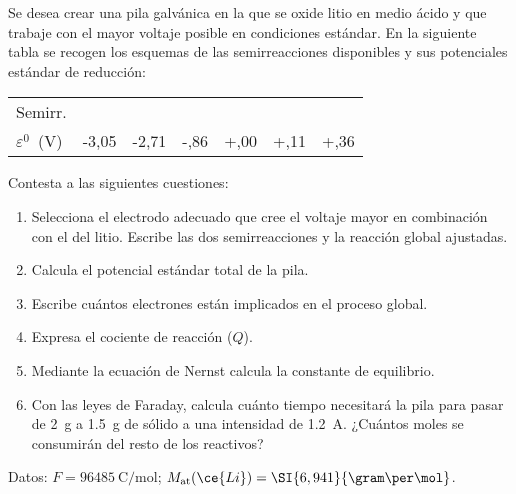 Se desea crear una pila galvánica en la que se oxide litio en medio ácido y que trabaje con el mayor voltaje posible en condiciones estándar. En la siguiente tabla se recogen los esquemas de las semirreacciones disponibles y sus potenciales estándar de reducción:
\begin{center}
	{\footnotesize
	\begin{tabular}{l|SSSSSS}
		\toprule
			{Semirr.}					&
			{}		&
			{}		&
			{}		&
			{}			&
			{}		&
			{}	\\
		{$\varepsilon^0$~(\si{\volt})}	&
			-3,05						&
			-2,71						&
			 -,86						&
			 +,00						&
			 +,11						&
			 +,36						\\
		\bottomrule
	\end{tabular}
	}
\end{center}
Contesta a las siguientes cuestiones:
\begin{enumerate}[label={\alph*)},font={\bfseries}]
	\item Selecciona el electrodo adecuado que cree el voltaje mayor en combinación con el del litio. Escribe las dos semirreacciones y la reacción global ajustadas.
	\item Calcula el potencial estándar total de la pila.
	\item Escribe cuántos electrones están implicados en el proceso global.
	\item Expresa el cociente de reacción ($Q$).
	\item Mediante la ecuación de Nernst calcula la constante de equilibrio.
	\item Con las leyes de Faraday, calcula cuánto tiempo necesitará la pila para pasar de \SI{2}{\gram} a \SI{1,5}{\gram} de  sólido a una intensidad de \SI{1,2}{\ampere}. ¿Cuántos moles se consumirán del resto de los reactivos?
\end{enumerate}
Datos: $F = \SI{96485}{\coulomb\per\mol}$; $M_{\text{at}}(\ce{Li}) = \SI{6,941}{\gram\per\mol}$.
